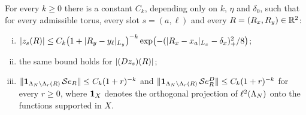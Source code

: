 \begin{lemma}\label{lem:localization}
For every $k\ge0$ there is a constant $C_k$, depending only on $k$, $\eta$ and $\delta_0$, such that for every
admissible torus, every slot $s=(a,\ell)$ and every $R=(R_x,R_y)\in\mathbb{R}^2$:
\begin{enumerate}[(i)]
\item $\lvert z_s(R)\rvert\le C_k\bigl(1+\lvert R_y-y_\ell\rvert_{L_y}\bigr)^{-k}\exp\bigl(-(\lvert R_x-x_a\rvert_{L_x}-\delta_x)_{+}^2/8\bigr)$;
\item the same bound holds for $\lvert(Dz_s)(R)\rvert$;
\item $\lVert\mathbf{1}_{\Lambda_N\setminus\Lambda_{r}(R)}\,\mathcal{S}e_{R}\rVert\le C_k(1+r)^{-k}$ and
$\lVert\mathbf{1}_{\Lambda_N\setminus\Lambda_{r}(R)}\,\mathcal{S}e^{D}_{R}\rVert\le C_k(1+r)^{-k}$ for every $r\ge0$, where $\mathbf{1}_X$ denotes the
orthogonal projection of $\ell^2(\Lambda_N)$ onto the functions supported in $X$.
\end{enumerate}
\end{lemma}


